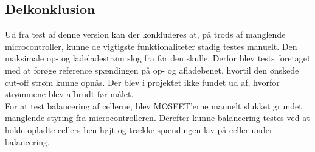 \subsection{Delkonklusion}
Ud fra test af denne version kan der konkluderes at, på trods af manglende microcontroller, kunne de vigtigste funktionaliteter stadig testes manuelt. Den maksimale op- og ladeladestrøm slog fra før den skulle. Derfor blev tests foretaget med at forøge reference spændingen på op- og afladebenet, hvortil den ønskede cut-off strøm kunne opnås. Der blev i projektet ikke fundet ud af, hvorfor strømmene blev afbrudt før målet.
\\

For at test balancering af cellerne, blev MOSFET'erne manuelt slukket grundet manglende styring fra microcontrolleren. Derefter kunne balancering testes ved at holde opladte cellers ben højt og trække spændingen lav på celler under balancering.





